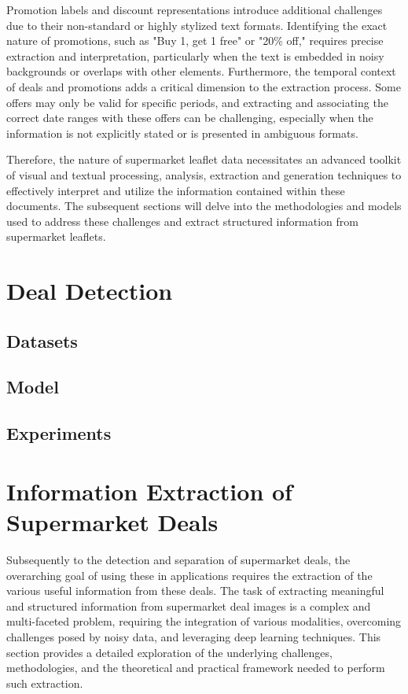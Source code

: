 \documentclass[11pt]{article}
\begin{document}
Promotion labels and discount representations introduce additional challenges due to their non-standard or highly stylized text formats. Identifying the exact nature of promotions, such as "Buy 1, get 1 free" or "20\% off," requires precise extraction and interpretation, particularly when the text is embedded in noisy backgrounds or overlaps with other elements. Furthermore, the temporal context of deals and promotions adds a critical dimension to the extraction process. Some offers may only be valid for specific periods, and extracting and associating the correct date ranges with these offers can be challenging, especially when the information is not explicitly stated or is presented in ambiguous formats.

Therefore, the nature of supermarket leaflet data necessitates an advanced toolkit of visual and textual processing, analysis, extraction and generation techniques to effectively interpret and utilize the information contained within these documents. The subsequent sections will delve into the methodologies and models used to address these challenges and extract structured information from supermarket leaflets.

\section{Deal Detection}
    \subsection{Datasets}
    \subsection{Model}
    \subsection{Experiments}

\section{Information Extraction of Supermarket Deals}
Subsequently to the detection and separation of supermarket deals, the overarching goal of using these in applications requires the extraction of the various useful information from these deals. 
The task of extracting meaningful and structured information from supermarket deal images is a complex and multi-faceted problem, requiring the integration of various modalities, overcoming challenges posed by noisy data, and leveraging deep learning techniques. This section provides a detailed exploration of the underlying challenges, methodologies, and the theoretical and practical framework needed to perform such extraction.
\end{document}

